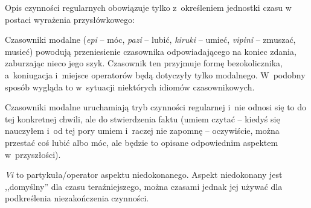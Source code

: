 \begin{spacing}{1.1}


Opis czynności regularnych obowiązuje tylko z~określeniem jednostki czasu w
postaci wyrażenia przysłówkowego:




Czasowniki modalne (\emph{epi} -- móc, \emph{pazi} -- lubić, \emph{kiruki} --
umieć, \emph{vipini} -- zmuszać, musieć) powodują przeniesienie czasownika
odpowiadającego na koniec zdania, zaburzając nieco jego szyk. Czasownik ten
przyjmuje formę bezokolicznika, a~koniugacja i~miejsce operatorów będą dotyczyły
tylko modalnego. W~podobny sposób wygląda to w~sytuacji niektórych idiomów
czasownikowych.



Czasowniki modalne uruchamiają tryb czynności regularnej i~nie odnosi się to do
tej konkretnej chwili, ale do stwierdzenia faktu (umiem czytać -- kiedyś się
nauczyłem i~od tej pory umiem i~raczej nie zapomnę -- oczywiście, można przestać
coś lubić albo móc, ale będzie to opisane odpowiednim aspektem w~przyszłości).




\emph{Vi} to partykuła/operator aspektu niedokonanego. Aspekt niedokonany jest
,,domyślny'' dla czasu teraźniejszego, można czasami jednak jej używać dla
podkreślenia niezakończenia czynności.


\end{spacing}
